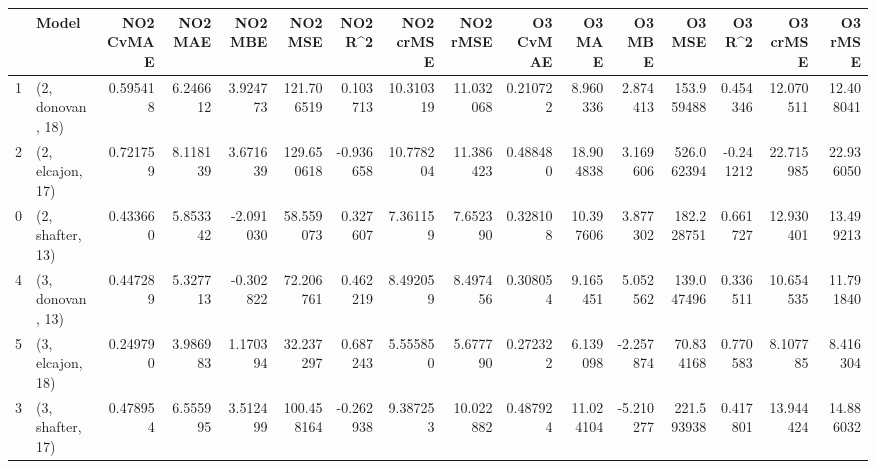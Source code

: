 \begin{tabular}{llrrrrrrrrrrrrrr}
\toprule
{} &             Model &  NO2 CvMAE &   NO2 MAE &   NO2 MBE &     NO2 MSE &   NO2 R\textasciicircum2 &  NO2 crMSE &   NO2 rMSE &  O3 CvMAE &     O3 MAE &    O3 MBE &      O3 MSE &    O3 R\textasciicircum2 &   O3 crMSE &    O3 rMSE \\
\midrule
1 &  (2, donovan, 18) &   0.595418 &  6.246612 &  3.924773 &  121.706519 &  0.103713 &  10.310319 &  11.032068 &  0.210722 &   8.960336 &  2.874413 &  153.959488 &  0.454346 &  12.070511 &  12.408041 \\
2 &  (2, elcajon, 17) &   0.721759 &  8.118139 &  3.671639 &  129.650618 & -0.936658 &  10.778204 &  11.386423 &  0.488480 &  18.904838 &  3.169606 &  526.062394 & -0.241212 &  22.715985 &  22.936050 \\
0 &  (2, shafter, 13) &   0.433660 &  5.853342 & -2.091030 &   58.559073 &  0.327607 &   7.361159 &   7.652390 &  0.328108 &  10.397606 &  3.877302 &  182.228751 &  0.661727 &  12.930401 &  13.499213 \\
4 &  (3, donovan, 13) &   0.447289 &  5.327713 & -0.302822 &   72.206761 &  0.462219 &   8.492059 &   8.497456 &  0.308054 &   9.165451 &  5.052562 &  139.047496 &  0.336511 &  10.654535 &  11.791840 \\
5 &  (3, elcajon, 18) &   0.249790 &  3.986983 &  1.170394 &   32.237297 &  0.687243 &   5.555850 &   5.677790 &  0.272322 &   6.139098 & -2.257874 &   70.834168 &  0.770583 &   8.107785 &   8.416304 \\
3 &  (3, shafter, 17) &   0.478954 &  6.555995 &  3.512499 &  100.458164 & -0.262938 &   9.387253 &  10.022882 &  0.487924 &  11.024104 & -5.210277 &  221.593938 &  0.417801 &  13.944424 &  14.886032 \\
\bottomrule
\end{tabular}
